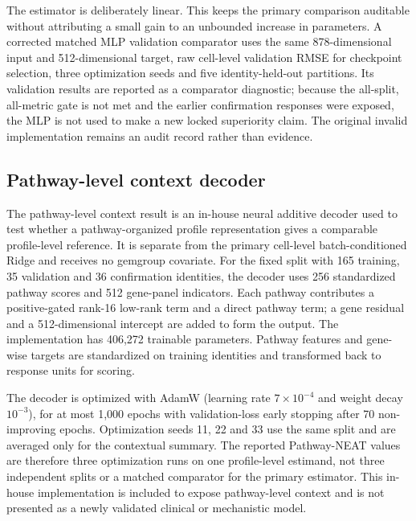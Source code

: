 \documentclass[10pt]{article}
\begin{document}
The estimator is deliberately linear. This keeps the primary comparison auditable without attributing a small gain to an unbounded increase in parameters. A corrected matched MLP validation comparator uses the same 878-dimensional input and 512-dimensional target, raw cell-level validation RMSE for checkpoint selection, three optimization seeds and five identity-held-out partitions. Its validation results are reported as a comparator diagnostic; because the all-split, all-metric gate is not met and the earlier confirmation responses were exposed, the MLP is not used to make a new locked superiority claim. The original invalid implementation remains an audit record rather than evidence.

\subsection{Pathway-level context decoder}
The pathway-level context result is an in-house neural additive decoder used to test whether a pathway-organized profile representation gives a comparable profile-level reference. It is separate from the primary cell-level batch-conditioned Ridge and receives no gemgroup covariate. For the fixed split with 165 training, 35 validation and 36 confirmation identities, the decoder uses 256 standardized pathway scores and 512 gene-panel indicators. Each pathway contributes a positive-gated rank-16 low-rank term and a direct pathway term; a gene residual and a 512-dimensional intercept are added to form the output. The implementation has 406,272 trainable parameters. Pathway features and gene-wise targets are standardized on training identities and transformed back to response units for scoring.

The decoder is optimized with AdamW (learning rate $7\times10^{-4}$ and weight decay $10^{-3}$), for at most 1,000 epochs with validation-loss early stopping after 70 non-improving epochs. Optimization seeds 11, 22 and 33 use the same split and are averaged only for the contextual summary. The reported Pathway-NEAT values are therefore three optimization runs on one profile-level estimand, not three independent splits or a matched comparator for the primary estimator. This in-house implementation is included to expose pathway-level context and is not presented as a newly validated clinical or mechanistic model.
\end{document}
